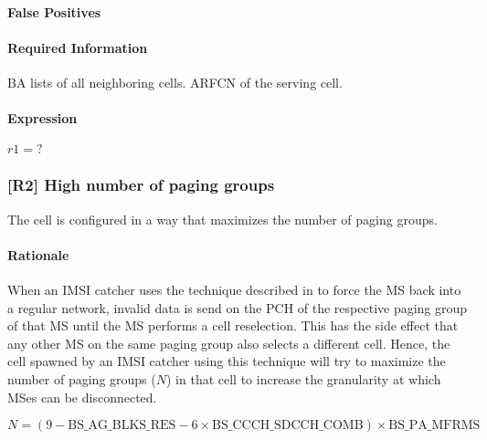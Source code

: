 \documentclass[a4paper,11pt,notitlepage,bigheadings,oneside]{scrartcl}
\begin{document}
\paragraph{False Positives}


\paragraph{Required Information}

BA lists of all neighboring cells. ARFCN of the serving cell.


\paragraph{Expression}

$r1 = ?$

\subsubsection{[R2] High number of paging groups}

The cell is configured in a way that maximizes the number of paging groups.

\paragraph{Rationale}

When an IMSI catcher uses the technique described in
\cite[0021]{bott2000verfahren} to force the MS back into a regular network,
invalid data is send on the PCH of the respective paging group of that MS until
the MS performs a cell reselection. This has the side effect that any other MS
on the same paging group also selects a different cell. Hence, the cell spawned
by an IMSI catcher using this technique will try to maximize the number of
paging groups ($N$) in that cell to increase the granularity at which MSes can
be disconnected.

${N} = (9 - {\text{BS\_AG\_BLKS\_RES}} - 6\times {\text{BS\_CCCH\_SDCCH\_COMB}})\times {\text{BS\_PA\_MFRMS}}$
\end{document}
